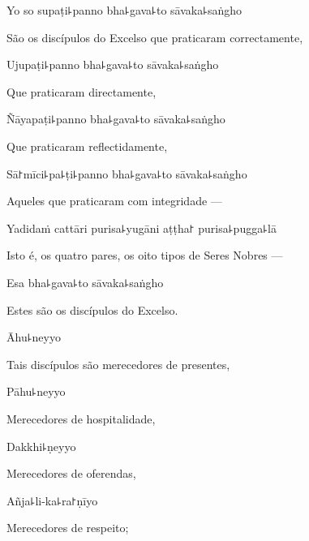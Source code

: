 Yo so supaṭi꜕panno bha꜕gava꜕to sāvaka꜕saṅgho

\begin{english}
  São os discípulos do Excelso que praticaram correctamente,
\end{english}

Ujupaṭi꜕panno bha꜕gava꜕to sāvaka꜕saṅgho

\begin{english}
  Que praticaram directamente,
\end{english}

Ñāyapaṭi꜕panno bha꜕gava꜕to sāvaka꜕saṅgho

\begin{english}
  Que praticaram reflectidamente,
\end{english}

Sā꜓mīci꜕pa꜕ṭi꜕panno bha꜕gava꜕to sāvaka꜕saṅgho

\begin{english}
  Aqueles que praticaram com integridade ---
\end{english}

Yadidaṁ cattāri purisa꜕yugāni aṭṭha꜓ purisa꜕pugga꜕lā

\begin{english}
  Isto é, os quatro pares, os oito tipos de Seres Nobres ---
\end{english}

Esa bha꜕gava꜕to sāvaka꜕saṅgho

\begin{english}
 Estes são os discípulos do Excelso.
\end{english}

Āhu꜕neyyo

\begin{english}
  Tais discípulos são merecedores de presentes,
\end{english}

Pāhu꜕neyyo

\begin{english}
  Merecedores de hospitalidade,
\end{english}

\clearpage

Dakkhi꜕ṇeyyo

\begin{english}
  Merecedores de oferendas,
\end{english}

Añja꜕li-ka꜕ra꜓ṇīyo

\begin{english}
  Merecedores de respeito;
\end{english}

